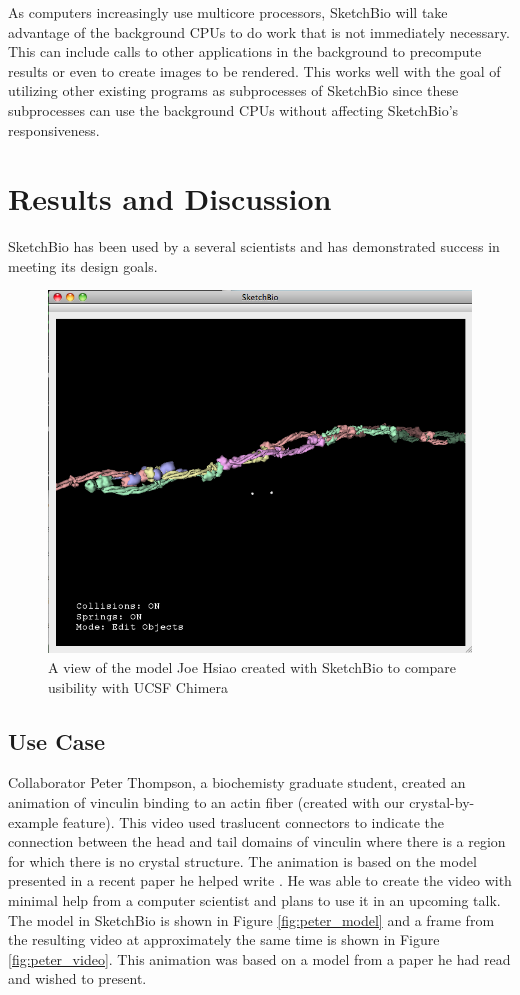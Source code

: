 \documentclass[twocolumn]{bmcart}%
\begin{document}
As computers increasingly use multicore processors, SketchBio will take advantage of the background CPUs to do work that is not immediately necessary.
This can include calls to other applications in the background to precompute results or even to create images to be rendered.
This works well with the goal of utilizing other existing programs as subprocesses of SketchBio since these subprocesses can use the background CPUs without affecting SketchBio's responsiveness.

\section*{Results and Discussion}
SketchBio has been used by a several scientists and has demonstrated success in meeting its design goals.

\begin{figure}[h]
\centering
\includegraphics[width=0.9\columnwidth]{joe_test.png}
\caption{A view of the model Joe Hsiao created with SketchBio to compare usibility with UCSF Chimera}
\label{fig:joe_test}
\end{figure}

\subsection*{Use Case}
Collaborator Peter Thompson, a biochemisty graduate student, created an animation of vinculin binding to an actin fiber (created with our crystal-by-example feature).
This video used traslucent connectors to indicate the connection between the head and tail domains of vinculin where there is a region for which there is no crystal structure.
The animation is based on the model presented in a recent paper he helped write \cite{thievessen2013vinculin}.
He was able to create the video with minimal help from a computer scientist and plans to use it in an upcoming talk.
The model in SketchBio is shown in Figure \ref{fig:peter_model} and a frame from the resulting video at approximately the same time is shown in Figure \ref{fig:peter_video}.
This animation was based on a model from a paper he had read and wished to present.
\end{document}
